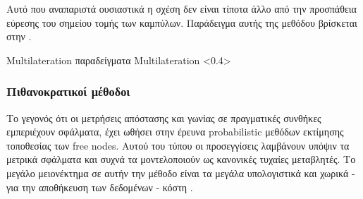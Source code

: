 Αυτό που αναπαριστά ουσιαστικά η σχέση  δεν είναι τίποτα άλλο από την προσπάθεια εύρεσης του σημείου τομής των καμπύλων.
Παράδειγμα αυτής της μεθόδου βρίσκεται στην .

%
{Multilateration παραδείγματα}%
{Multilateration}%
<0.4>

\subsubsection{Πιθανοκρατικοί μέθοδοι}%
Το γεγονός ότι οι μετρήσεις απόστασης και γωνίας σε πραγματικές συνθήκες εμπε\-ριέ\-χουν σφάλματα, έχει ωθήσει στην έρευνα 
probabilistic μεθόδων εκτίμησης τοποθεσίας των free nodes. Αυτού του τύπου οι προσεγγίσεις λαμβάνουν υπόψιν τα μετρικά σφάλματα και συχνά τα μοντελοποιούν ως κανονικές
τυχαίες μεταβλητές. Το μεγάλο μειονέκτημα σε αυτήν την μέθοδο είναι τα μεγάλα υπολογιστικά και χωρικά - για την αποθήκευση των δεδομένων - κόστη \cite{wsn-Localization-systems}. 

